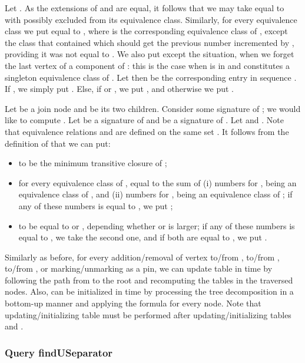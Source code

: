 \documentclass[a4paper,11pt]{article}
\theoremstyle{definition}
\theoremstyle{remark}
\newcommand{\qUsep}{\textnormal{findUSeparator}}
\begin{document}
Let .  As the extensions
of  and  are equal, it follows that we may take 
equal to  with  possibly excluded from its equivalence class.
Similarly, for every equivalence class  we put  equal
to , where  is the corresponding equivalence class of
, except the class that contained  which should get the
previous number incremented by , providing it was not equal to
.  We also put  except the situation, when
we forget the last vertex of a component of : this is the case when  is in  and
constitutes a singleton equivalence class of .  Let then
 be the corresponding entry in sequence .  If , we simply put .
Else, if  or , we put
, and otherwise we put
.

\vskip 0.3cm

 Let  be a join node and
 be its two children.  Consider some signature
 of ; we would like to compute
.  Let
 be a signature of  and
 be a signature of .  Let
 and
.  Note that equivalence relations
 and  are defined on the same set .  It
follows from the definition of  that we can put:
\begin{itemize}
\item  to be the minimum transitive closure of ;
\item for every equivalence class  of ,  equal to the
  sum of (i) numbers  for ,  being
  an equivalence class of , and (ii) numbers 
  for ,  being an equivalence class of ;
  if any of these numbers is equal to , we put ;
\item  to be equal to  or
  , depending whether  or  is
  larger; if any of these numbers is equal to , we take the
  second one, and if both are equal to , we put .
\end{itemize}

\vskip 0.3cm

Similarly as before, for every addition/removal of vertex  to/from
, to/from , to/from , or marking/unmarking  as a pin, we
can update table  in  time by
following the path from  to the root and recomputing the tables
in the traversed nodes.  Also,  can be initialized in  time by processing the tree decomposition in a
bottom-up manner and applying the formula for every node.  Note that
updating/initializing table  must be performed after
updating/initializing tables  and .

\subsubsection{Query \qUsep}\label{sec:queries}
\end{document}
